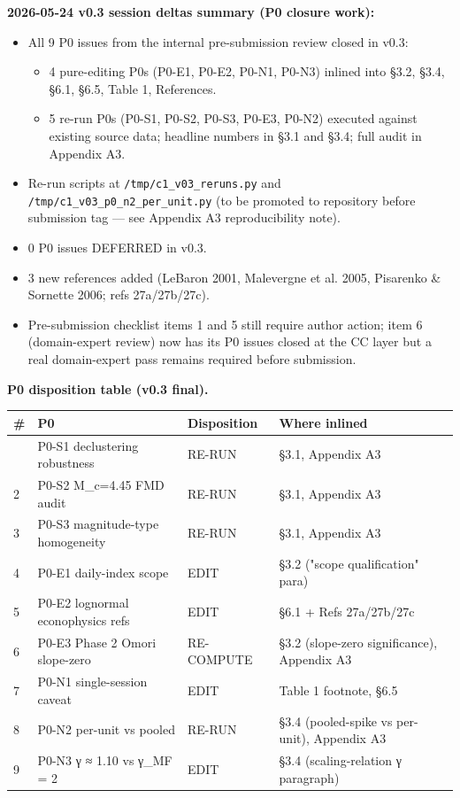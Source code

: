 \documentclass[
  11pt]{article}
\newcounter{none} %
\providecommand{\tightlist}{%
  \setlength{\itemsep}{0pt}\setlength{\parskip}{0pt}}
\begin{document}
\textbf{2026-05-24 v0.3 session deltas summary (P0 closure work):}

\begin{itemize}
\tightlist
\item
  All 9 P0 issues from the internal pre-submission review closed in
  v0.3:

  \begin{itemize}
  \tightlist
  \item
    4 pure-editing P0s (P0-E1, P0-E2, P0-N1, P0-N3) inlined into §3.2,
    §3.4, §6.1, §6.5, Table 1, References.
  \item
    5 re-run P0s (P0-S1, P0-S2, P0-S3, P0-E3, P0-N2) executed against
    existing source data; headline numbers in §3.1 and §3.4; full audit
    in Appendix A3.
  \end{itemize}
\item
  Re-run scripts at \texttt{/tmp/c1\_v03\_reruns.py} and
  \texttt{/tmp/c1\_v03\_p0\_n2\_per\_unit.py} (to be promoted to
  repository before submission tag --- see Appendix A3 reproducibility
  note).
\item
  0 P0 issues DEFERRED in v0.3.
\item
  3 new references added (LeBaron 2001, Malevergne et al. 2005,
  Pisarenko \& Sornette 2006; refs 27a/27b/27c).
\item
  Pre-submission checklist items 1 and 5 still require author action;
  item 6 (domain-expert review) now has its P0 issues closed at the CC
  layer but a real domain-expert pass remains required before
  submission.
\end{itemize}

\textbf{P0 disposition table (v0.3 final).}

{\def\LTcaptype{none} %
\begin{longtable}[]{@{}llll@{}}
\toprule\noalign{}
\# & P0 & Disposition & Where inlined \\
\midrule\noalign{}
\endhead
\bottomrule\noalign{}
\endlastfoot
1 & P0-S1 declustering robustness & RE-RUN & §3.1, Appendix A3 \\
2 & P0-S2 M\_c=4.45 FMD audit & RE-RUN & §3.1, Appendix A3 \\
3 & P0-S3 magnitude-type homogeneity & RE-RUN & §3.1, Appendix A3 \\
4 & P0-E1 daily-index scope & EDIT & §3.2 ("scope qualification"
para) \\
5 & P0-E2 lognormal econophysics refs & EDIT & §6.1 + Refs
27a/27b/27c \\
6 & P0-E3 Phase 2 Omori slope-zero & RE-COMPUTE & §3.2 (slope-zero
significance), Appendix A3 \\
7 & P0-N1 single-session caveat & EDIT & Table 1 footnote, §6.5 \\
8 & P0-N2 per-unit vs pooled & RE-RUN & §3.4 (pooled-spike vs per-unit),
Appendix A3 \\
9 & P0-N3 γ ≈ 1.10 vs γ\_MF = 2 & EDIT & §3.4 (scaling-relation γ
paragraph) \\
\end{longtable}
}
\end{document}

